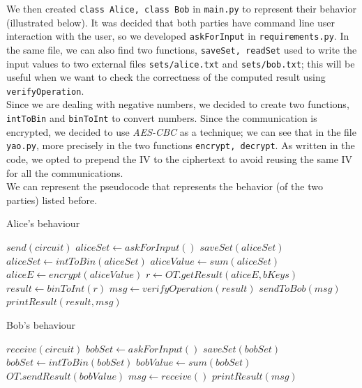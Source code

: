 \documentclass[12pt]{article}
\newcommand{\inlinecode}{\texttt}
\begin{document}
We then created \inlinecode{class Alice, class Bob} in \inlinecode{main.py} to represent their behavior (illustrated below).
It was decided that both parties have command line user interaction with the user, so we developed \inlinecode{askForInput} in \inlinecode{requirements.py}. In the same file, we can also find two functions, \inlinecode{saveSet, readSet} used to write the input values to two external files \inlinecode{sets/alice.txt} and \inlinecode{sets/bob.txt}; this will be useful when we want to check the correctness of the computed result using \inlinecode{verifyOperation}.\\ Since we are dealing with negative numbers, we decided to create two functions, \inlinecode{intToBin} and \inlinecode{binToInt} to convert numbers. Since the communication is encrypted, we decided to use \textit{AES-CBC} as a technique; we can see that in the file \inlinecode{yao.py}, more precisely in the two functions \inlinecode{encrypt, decrypt}. As written in the code, we opted to prepend the IV to the ciphertext to avoid reusing the same IV for all the communications.\\
We can represent the pseudocode that represents the behavior (of the two parties) listed before.\\

\begin{minipage}{0.46\textwidth}
    \begin{algorithm}[H]
        \centering
        \caption{Alice's behaviour}\label{alice:algo}
        \begin{algorithmic}[1]
            \State $send(circuit)$  
            \State $aliceSet \gets askForInput()$ 
            \State $saveSet(aliceSet)$ 
            \State $aliceSet \gets intToBin(aliceSet)$ 
            \State
            \State $aliceValue \gets sum(aliceSet)$
            \State $aliceE \gets encrypt(aliceValue)$
            \State
            \State $r \gets OT.getResult(aliceE,bKeys)$
            \State
            \State $result \gets binToInt(r)$
            \State $msg \gets verifyOperation(result)$ 
            \State $sendToBob(msg)$
            \State $printResult(result,msg)$

        \end{algorithmic}
    \end{algorithm}
    \end{minipage}
    \hfill
    \begin{minipage}{0.46\textwidth}
    \begin{algorithm}[H]
        \centering
        \caption{Bob's behaviour}\label{bob:algo}
        \begin{algorithmic}[1]
            \State $receive(circuit)$  
            \State $bobSet \gets askForInput()$ 
            \State $saveSet(bobSet)$ 
            \State $bobSet \gets intToBin(bobSet)$ 
            \State
            \State $bobValue \gets sum(bobSet)$
            \State
            \State $OT.sendResult(bobValue)$
            \State
            \State $msg \gets receive()$
            \State $printResult(msg)$

        \end{algorithmic}
    \end{algorithm}
    \end{minipage}
\clearpage
\end{document}
